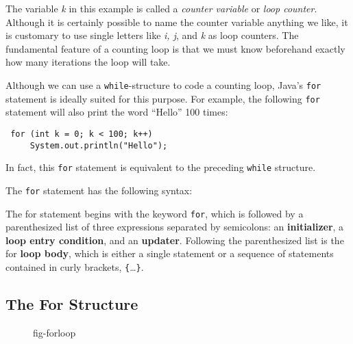 The variable {\it k} in this example is called a
{\it counter variable} or {\it loop counter}.  Although it is
certainly possible to name the counter variable anything we like, it
is customary to use single letters like {\it i, j}, and {\it k} as
loop counters.  The fundamental feature of a counting loop is that we
must know beforehand exactly how many iterations the loop will take.


\noindent Although we can use a {\tt while}-structure to
code a counting loop, Java's {\tt for} statement is ideally suited for
this purpose.  For example, the following {\tt for} statement will also
print the word ``Hello'' 100 times:

\begin{jjjlisting}
\begin{lstlisting}
 for (int k = 0; k < 100; k++)
     System.out.println("Hello");
\end{lstlisting}
\end{jjjlisting}

\noindent In fact, this {\tt for} statement is equivalent
to the preceding {\tt while} structure. 

The {\tt for} statement has the following syntax:


\noindent The for statement begins with the keyword {\tt for}, which
is followed by a parenthesized list of three expressions separated by
semicolons: an {\bf initializer}, a {\bf loop entry condition}, and an
{\bf updater}.  Following the parenthesized list is the for {\bf loop
body}, which is either a single statement or a sequence of statements
contained in curly brackets, \verb|{|\dots\verb|}|.

\subsection{The For Structure}
\begin{figure}[tb]
 {fig-forloop}

\end{figure}

